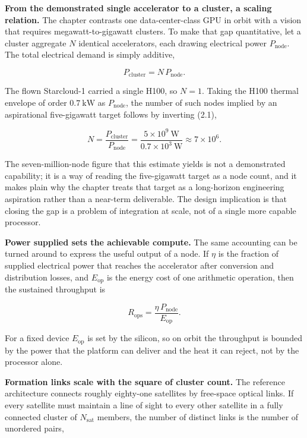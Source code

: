 \documentclass[
  11pt,
  openany,
  oneside]{book}
\begin{document}
\textbf{From the demonstrated single accelerator to a cluster, a scaling
relation.} The chapter contrasts one data-center-class GPU in orbit with
a vision that requires megawatt-to-gigawatt clusters. To make that gap
quantitative, let a cluster aggregate \(N\) identical accelerators, each
drawing electrical power \(P_{\mathrm{node}}\). The total electrical
demand is simply additive,

\begin{equation}
P_{\mathrm{cluster}} = N\,P_{\mathrm{node}}. \tag{2.1}
\end{equation}

The flown Starcloud-1 carried a single H100, so \(N=1\). Taking the H100
thermal envelope of order \(0.7\ \mathrm{kW}\) as \(P_{\mathrm{node}}\),
the number of such nodes implied by an aspirational five-gigawatt target
follows by inverting (2.1),

\begin{equation}
N = \frac{P_{\mathrm{cluster}}}{P_{\mathrm{node}}} = \frac{5\times10^{9}\ \mathrm{W}}{0.7\times10^{3}\ \mathrm{W}} \approx 7\times10^{6}. \tag{2.2}
\end{equation}

The seven-million-node figure that this estimate yields is not a
demonstrated capability; it is a way of reading the five-gigawatt target
as a node count, and it makes plain why the chapter treats that target
as a long-horizon engineering aspiration rather than a near-term
deliverable. The design implication is that closing the gap is a problem
of integration at scale, not of a single more capable processor.

\textbf{Power supplied sets the achievable compute.} The same accounting
can be turned around to express the useful output of a node. If \(\eta\)
is the fraction of supplied electrical power that reaches the
accelerator after conversion and distribution losses, and
\(E_{\mathrm{op}}\) is the energy cost of one arithmetic operation, then
the sustained throughput is

\begin{equation}
R_{\mathrm{ops}} = \frac{\eta\,P_{\mathrm{node}}}{E_{\mathrm{op}}}. \tag{2.3}
\end{equation}

For a fixed device \(E_{\mathrm{op}}\) is set by the silicon, so on
orbit the throughput is bounded by the power that the platform can
deliver and the heat it can reject, not by the processor alone.

\textbf{Formation links scale with the square of cluster count.} The
reference architecture connects roughly eighty-one satellites by
free-space optical links. If every satellite must maintain a line of
sight to every other satellite in a fully connected cluster of
\(N_{\mathrm{sat}}\) members, the number of distinct links is the number
of unordered pairs,
\end{document}
